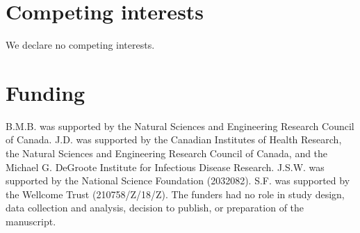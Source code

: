 \documentclass[12pt]{article}
\begin{document}
\section*{Competing interests}

We declare no competing interests.

\section*{Funding}

B.M.B. was supported by the Natural Sciences and Engineering Research Council of Canada. 
J.D. was supported by the Canadian Institutes of Health Research, 
the Natural Sciences and Engineering Research Council of Canada, 
and the Michael G. DeGroote Institute for Infectious Disease Research.
J.S.W. was supported by the National Science Foundation (2032082).
S.F. was supported by the Wellcome Trust (210758/Z/18/Z).
The funders had no role in study design, data collection and analysis, decision to publish, or preparation of the manuscript.

\pagebreak
\end{document}
